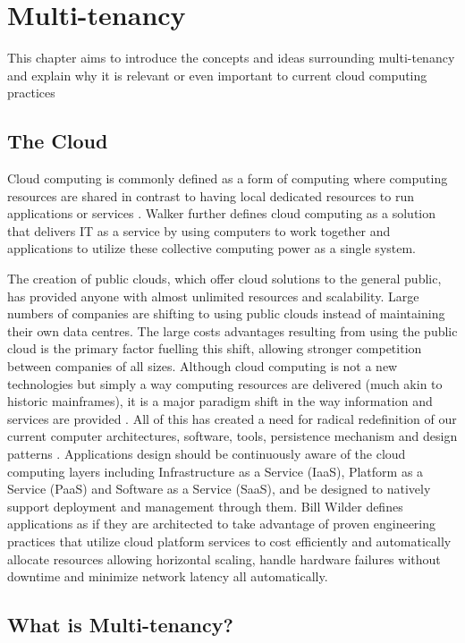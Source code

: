 \chapter{Multi-tenancy}
This chapter aims to introduce the concepts and ideas surrounding multi-tenancy and explain why it is relevant or even important to current cloud computing practices

\section{The Cloud}

Cloud computing is commonly defined as a form of computing where computing resources are shared in contrast to having local dedicated resources to run applications or services \cite{webopedia}. Walker \cite{GraceWalker} further defines cloud computing as a solution that delivers IT as a service by using computers to work together and applications to utilize these collective computing power as a single system.
 
The creation of public clouds, which offer cloud solutions to the general public, has provided anyone with almost unlimited resources and scalability. Large numbers of companies are shifting to using public clouds instead of maintaining their own data centres. The large costs advantages resulting from using the public cloud is the primary factor fuelling this shift, allowing stronger competition between companies of all sizes. Although cloud computing is not a new technologies but simply a way computing resources are delivered (much akin to historic mainframes), it is a major paradigm shift in the way information and services are provided \cite{GraceWalker}. All of this has created a need for radical redefinition of our current computer architectures, software, tools, persistence mechanism and design patterns \cite{GraceWalker}. Applications design should be continuously aware of the cloud computing layers including Infrastructure as a Service (IaaS), Platform as a Service (PaaS) and Software as a Service (SaaS), and be designed to natively support deployment and management through them. Bill Wilder \cite{Wilder2012-so} defines applications as  if they are architected to take advantage of proven engineering practices that utilize cloud platform services to cost efficiently and automatically allocate resources allowing horizontal scaling, handle hardware failures without downtime and minimize network latency all automatically.


\section{What is Multi-tenancy?}

